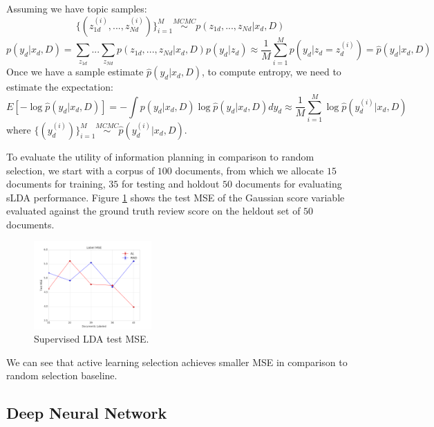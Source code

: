 Assuming we have topic samples:
\begin{equation}
   \{(z_{1d}^{(i)}, ..., z_{Nd}^{(i)})\}_{i=1}^{M} \stackrel{MCMC}{\sim} p(z_{1d},...,z_{Nd}|x_d, D) 
\end{equation}
\begin{equation}
   p(y_d|x_d, D) = \sum_{z_{1d}}...\sum_{z_{Nd}} p(z_{1d},...,z_{Nd}|x_d, D)p(y_d|z_d) \approx \frac{1}{M} \sum_{i=1}^{M}p(y_d|z_d = z_{d}^{(i)}) = \hat{p}(y_d|x_d, D)
\end{equation}
Once we have a sample estimate $\hat{p}(y_d|x_d, D)$, to compute entropy, we need to estimate the expectation:
\begin{equation}
   E[-\log \hat{p}(y_d|x_d,D)] = - \int p(y_d|x_d, D) \log \hat{p}(y_d|x_d, D) dy_d \approx \frac{1}{M}\sum_{i=1}^{M}\log \hat{p}(y_{d}^{(i)}|x_d, D)
\end{equation}
where $\{(y_{d}^{(i)})\}_{i=1}^{M} \stackrel{MCMC}{\sim} \hat{p}(y_{d}^{(i)}|x_d, D)$.

To evaluate the utility of information planning in comparison to random selection, we start with a corpus of $100$ documents, from which we allocate $15$ documents for training, $35$ for testing and holdout $50$ documents for evaluating sLDA performance. Figure \ref{fig:slda_test_mse} shows the test MSE of the Gaussian score variable evaluated against the ground truth review score on the heldout set of $50$ documents.

\begin{figure}[thpb]
    \centering
    \includegraphics[width=0.4\textwidth]{figures/slda_test_mse.png}
    \caption{Supervised LDA test MSE.}
    \label{fig:slda_test_mse}
\end{figure}

We can see that active learning selection achieves smaller MSE in comparison to random selection baseline.

\subsection{Deep Neural Network}

